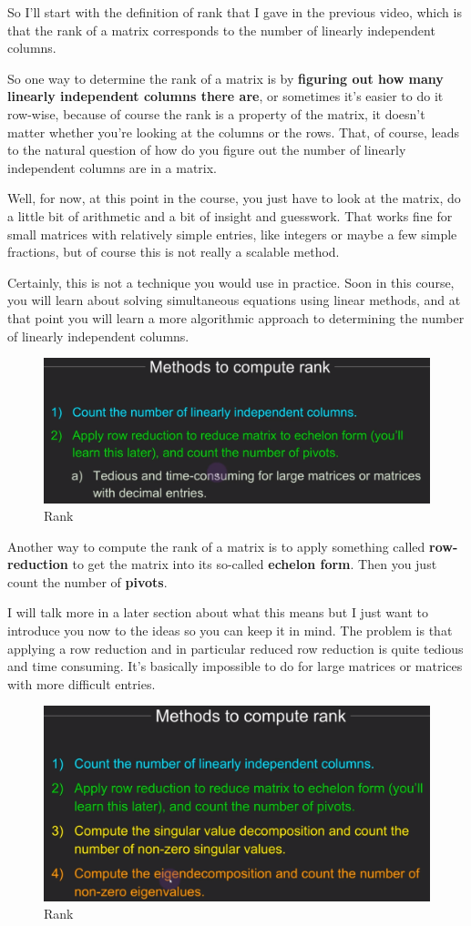 \documentclass[fleqn,10pt]{olplainarticle}
\theoremstyle{definition}
\theoremstyle{remark}
\begin{document}
So I'll start with the definition of rank that I gave in the previous video, which is that the rank of a matrix corresponds to the number of linearly independent columns.

So one way to determine the rank of a matrix is by \textbf{figuring out how many linearly independent columns there are}, or sometimes it's easier to do it row-wise, because of course the rank is a property of the matrix, it doesn't matter whether you're looking at the columns or the rows. That, of course, leads to the natural question of how do you figure out the number of linearly independent columns are in a matrix. 

Well, for now, at this point in the course, you just have to look at the matrix, do a little bit of arithmetic and a bit of insight and guesswork. That works fine for small matrices with relatively simple entries, like integers or maybe a few simple fractions, but of course this is not really a scalable method. 

Certainly, this is not a technique you would use in practice. Soon in this course, you will learn about solving simultaneous equations using linear methods, and at that point you will learn a more algorithmic approach to determining the number of linearly independent columns.

\begin{figure}[ht]
	\centering
	\includegraphics[width=0.5\linewidth]{images/rank-14.png}
	\caption{Rank}
	\label{fig:rank_14}
\end{figure}

Another way to compute the rank of a matrix is to apply something called \textbf{row-reduction} to get the matrix into its so-called \textbf{echelon form}. Then you just count the number of \textbf{pivots}.

I will talk more in a later section about what this means but I just want to introduce you now to the ideas so you can keep it in mind. The problem is that applying a row reduction and in particular reduced row reduction is quite tedious and time consuming. It's basically impossible to do for large matrices or matrices with more difficult entries.

\begin{figure}[ht]
	\centering
	\includegraphics[width=0.5\linewidth]{images/rank-15.png}
	\caption{Rank}
	\label{fig:rank_15}
\end{figure}
\end{document}
